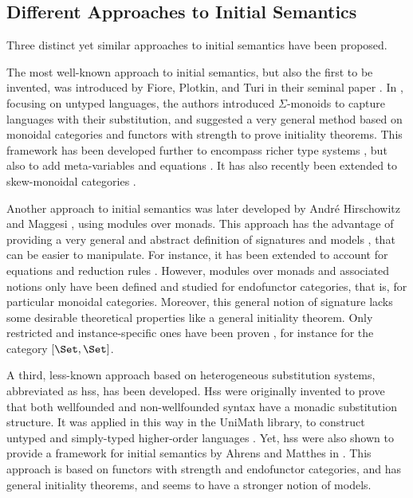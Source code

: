 \subsection{Different Approaches to Initial Semantics}

Three distinct yet similar approaches to initial semantics have been proposed.

%
The most well-known approach to initial semantics, but also the first to be invented,
was introduced by Fiore, Plotkin, and Turi in their seminal paper \cite{FPT99}.
%
In \cite{FPT99}, focusing on untyped languages, the authors introduced
$Σ$-monoids to capture languages with their substitution, and suggested
a very general method based on monoidal categories and functors with strength
to prove initiality theorems.
%
This framework has been developed further to encompass richer type systems
\cite{Cbn02,MMCCS05,SecondOrderDep08,Polymorphism11,ListObjects17},
but also to add meta-variables and equations
\cite{HamanaMetavar04,SecondOrderDep08,HurPhd,PolymorphismEq13,FioreSzamozvancevPopl22}.
It has also recently been extended to skew-monoidal categories \cite{CellularHoweTheorem20}.

%
Another approach to initial semantics was later developed by André Hirschowitz
and Maggesi \cite{HirschowitzMaggesi07}, using modules over monads.
%
This approach has the advantage of providing a very general and abstract definition
of signatures and models \cite{HirschowitzMaggesi12,ZsidoPhd10,PresentableSignatures21},
that can be easier to manipulate.
%
For instance, it has been extended to account for equations
\cite{PresentableSignatures21,2Signatures19} and reduction rules
\cite{UntypedRelativeMonads16,TypedRelativeMonads19,ReductionMonads20,TransitionMonads22}.
%
However, modules over monads and associated notions only have been defined and
studied for endofunctor categories, that is, for particular monoidal categories.
%
Moreover, this general notion of signature lacks some desirable theoretical properties like a general initiality theorem.
Only restricted and instance-specific ones have been proven \cite{HirschowitzMaggesi10,ZsidoPhd10},
for instance for the category $[\Set,\Set]$.

%
A third, less-known approach based on heterogeneous substitution systems,
abbreviated as hss, has been developed.
%
Hss were originally invented to prove that both wellfounded and
non-wellfounded syntax \cite{Hss04} have a monadic substitution structure.
%
It was applied in this way in the UniMath library, to construct untyped and
simply-typed higher-order languages \cite{HssUntypedUniMath19,HssTypedUnimath22}.
%
Yet, hss were also shown to provide a framework for initial semantics by
Ahrens and Matthes in \cite{HssRevisited15}.
%
This approach is based on functors with strength and endofunctor categories,
and has general initiality theorems, and seems to have a stronger notion
of models.

